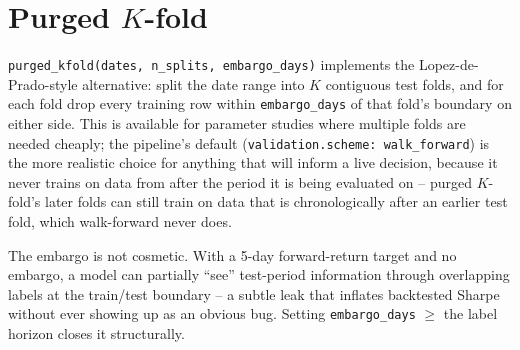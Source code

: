 \section{Purged $K$-fold}

\texttt{purged\_kfold(dates, n\_splits, embargo\_days)} implements the
Lopez-de-Prado-style alternative: split the date range into $K$ contiguous test
folds, and for each fold drop every training row within \texttt{embargo\_days}
of that fold's boundary on either side. This is available for parameter
studies where multiple folds are needed cheaply; the pipeline's default
(\texttt{validation.scheme: walk\_forward}) is the more realistic choice for
anything that will inform a live decision, because it never trains on data from
after the period it is being evaluated on -- purged $K$-fold's later folds can
still train on data that is chronologically after an earlier test fold, which
walk-forward never does.

\begin{designnote}
The embargo is not cosmetic. With a 5-day forward-return target and no embargo,
a model can partially ``see'' test-period information through overlapping
labels at the train/test boundary -- a subtle leak that inflates backtested
Sharpe without ever showing up as an obvious bug. Setting
\texttt{embargo\_days} $\geq$ the label horizon closes it structurally.
\end{designnote}
